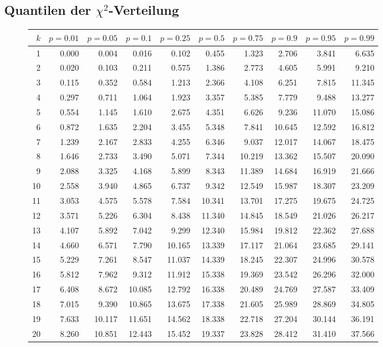 \subsection{Quantilen der $\chi^2$-Verteilung}
\begin{figure}[h!]
\begin{center}
\scriptsize
\begin{tabular}{|r|rrr|rrr|rrr|}
\hline
\strut$k$&$p=0.01$&$p=0.05$&$p=0.1$&$p=0.25$&$p=0.5$&$p=0.75$&$p=0.9$&$p=0.95$&$p=0.99$\\
\hline
1&0.000&0.004&0.016&0.102&0.455&1.323&2.706&3.841&6.635\\
2&0.020&0.103&0.211&0.575&1.386&2.773&4.605&5.991&9.210\\
3&0.115&0.352&0.584&1.213&2.366&4.108&6.251&7.815&11.345\\
4&0.297&0.711&1.064&1.923&3.357&5.385&7.779&9.488&13.277\\
5&0.554&1.145&1.610&2.675&4.351&6.626&9.236&11.070&15.086\\
6&0.872&1.635&2.204&3.455&5.348&7.841&10.645&12.592&16.812\\
7&1.239&2.167&2.833&4.255&6.346&9.037&12.017&14.067&18.475\\
8&1.646&2.733&3.490&5.071&7.344&10.219&13.362&15.507&20.090\\
9&2.088&3.325&4.168&5.899&8.343&11.389&14.684&16.919&21.666\\
10&2.558&3.940&4.865&6.737&9.342&12.549&15.987&18.307&23.209\\
11&3.053&4.575&5.578&7.584&10.341&13.701&17.275&19.675&24.725\\
12&3.571&5.226&6.304&8.438&11.340&14.845&18.549&21.026&26.217\\
13&4.107&5.892&7.042&9.299&12.340&15.984&19.812&22.362&27.688\\
14&4.660&6.571&7.790&10.165&13.339&17.117&21.064&23.685&29.141\\
15&5.229&7.261&8.547&11.037&14.339&18.245&22.307&24.996&30.578\\
16&5.812&7.962&9.312&11.912&15.338&19.369&23.542&26.296&32.000\\
17&6.408&8.672&10.085&12.792&16.338&20.489&24.769&27.587&33.409\\
18&7.015&9.390&10.865&13.675&17.338&21.605&25.989&28.869&34.805\\
19&7.633&10.117&11.651&14.562&18.338&22.718&27.204&30.144&36.191\\
20&8.260&10.851&12.443&15.452&19.337&23.828&28.412&31.410&37.566\\

\end{tabular}
\end{center}
\end{figure}
